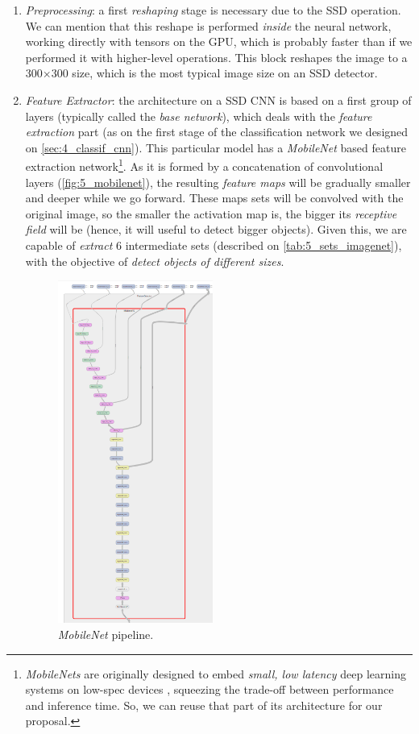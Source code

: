 		\begin{enumerate}
			
			\item \emph{Preprocessing}: a first \emph{reshaping} stage is necessary due to the SSD operation. We can mention that this reshape is performed \emph{inside} the neural network, working directly with tensors on the GPU, which is probably faster than if we performed it with higher-level operations. This block reshapes the image to a 300$\times$300 size, which is the most typical image size on an SSD detector.
			\item \emph{Feature Extractor}: the architecture on a SSD CNN is based on a first group of layers (typically called the \emph{base network}), which deals with the \emph{feature extraction} part (as on the first stage of the classification network we designed on \autoref{sec:4_classif_cnn}). This particular model has a \emph{MobileNet} based feature extraction network\footnote{\emph{MobileNets} are originally designed to embed \emph{small, low latency} deep learning systems on low-spec devices \cite{mobilenet}, squeezing the trade-off between performance and inference time. So, we can reuse that part of its architecture for our proposal.}.  As it is formed by a concatenation of convolutional layers (\autoref{fig:5_mobilenet}), the resulting \emph{feature maps} will be gradually smaller and deeper while we go forward. These maps sets will be convolved with the original image, so the smaller the activation map is, the bigger its \emph{receptive field} will be (hence, it will useful to detect bigger objects). Given this, we are capable of \emph{extract} 6 intermediate sets (described on \autoref{tab:5_sets_imagenet}), with the objective of \emph{detect objects of different sizes}.
			
			\begin{figure}[h]
				\centering
				\includegraphics[width=2in]{images/ssd_mobilenet_2}
				\caption{\emph{MobileNet} pipeline.}
				\label{fig:5_mobilenet}
			\end{figure}


\end{enumerate}
